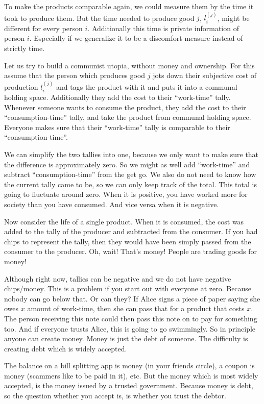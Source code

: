 To make the products comparable again, we could measure them by the time it took
to produce them. But the time needed to produce good \(j\), \(l_i^{(j)}\), might
be different for every person \(i\). Additionally this time is private
information of person \(i\). Especially if we generalize it to be a discomfort
measure instead of strictly time.


\begin{example}
	\label{ex: Definitely not Capitalism}
	Let us try to build a communist utopia, without money and ownership.  For
	this assume that the person which produces good \(j\) jots down their
	subjective cost of production \(l_i^{(j)}\) and tags the product with it and
	puts it into a communal holding space. Additionally they add the cost to
	their ``work-time'' tally.  Whenever someone wants to consume the product,
	they add the cost to their ``consumption-time'' tally, and take the product
	from communal holding space.  Everyone makes sure that their ``work-time''
	tally is comparable to their ``consumption-time''.

	We can simplify the two tallies into one, because we only want to make
	sure that the difference is approximately zero. So we might as well add
	``work-time'' and subtract ``consumption-time'' from the get go. We also do not
	need to know how the current tally came to be, so we can only keep track of
	the total. This total is going to fluctuate around zero. When it is positive,
	you have worked more for society than you have consumed. And vice versa when it
	is negative.

	Now consider the life of a single product. When it is consumed, the cost was
	added to the tally of the producer and subtracted from the consumer. If you
	had chips to represent the tally, then they would have been simply passed from
	the consumer to the producer. Oh, wait! That's money! People are trading goods
	for money!

	Although right now, tallies can be negative and we do not have negative
	chips/money. This is a problem if you start out with everyone at zero. Because
	nobody can go below that. Or can they? If Alice signs a piece of paper saying
	she owes \(x\) amount of work-time, then she can pass that for a product that
	costs \(x\). The person receiving this note could then pass this note on to
	pay for something too. And if everyone trusts Alice, this is going to go
	swimmingly. So in principle anyone can create money. Money is just the debt of
	someone. The difficulty is creating debt which is widely accepted.

	The balance on a bill splitting app is money (in your friends circle), a coupon
	is money (scammers like to be paid in it), etc. But the money which is most
	widely accepted, is the money issued by a trusted government. Because money is
	debt, so the question whether you accept is, is whether you trust the debtor.
\end{example}
